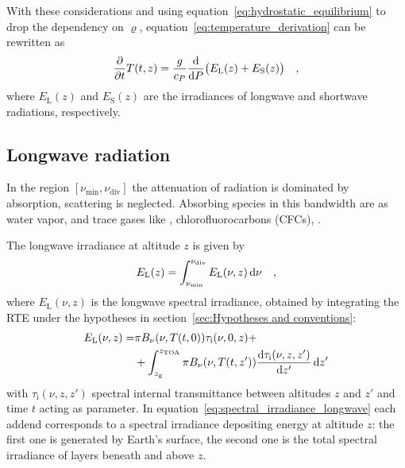 \documentclass[a4paper,10pt,twocolumn,\classoptions]{article}
\newcommand{\zTOA}{z_\text{TOA}}
\begin{document}
With these considerations and using equation~\eqref{eq:hydrostatic_equilibrium} to drop the dependency on $\varrho$, equation~\eqref{eq:temperature_derivation} can be rewritten as
\begin{equation}
  \label{eq:temperature_time_derivative}
  \pdv*{T(t,z)}{t} = \frac{g}{c_P} \odv*{\big( E_\text{L}(z) + E_\text{S}(z) \big)}{P}
  \quad ,
\end{equation}
where $E_\text{L}(z)$ and $E_\text{S}(z)$ are the irradiances of longwave and shortwave radiations, respectively.



\subsection{Longwave radiation}
\label{sec:Longwave radiation}
In the region $[\nu_\text{min}, \nu_\text{div}]$ the attenuation of radiation is dominated by absorption, scattering is neglected.
Absorbing species in this bandwidth are  as water vapor,  and trace gases like , chlorofluorocarbons (CFCs), .

The longwave irradiance at altitude $z$ is given by
\begin{equation}
  \label{eq:irradiance_longwave}
  E_\text{L}(z) = \int_{\nu_\text{min}}^{\nu_\text{div}} E_\text{L}(\nu, z) \odif{\nu}
  \quad ,
\end{equation}
where $E_\text{L}(\nu, z)$ is the longwave spectral irradiance, obtained by integrating the RTE under the hypotheses in section~\ref{sec:Hypotheses and conventions}:
\begin{equation}
  \label{eq:spectral_irradiance_longwave}
  \begin{split}
    E_\text{L}(\nu, z) = & \pi B_\nu(\nu, T(t, 0)) \tau_\text{i}(\nu, 0, z) + \\
    & + \int_{z_\text{g}}^{\zTOA} \pi B_\nu(\nu, T(t, z')) \odv{\tau_\text{i}(\nu, z, z')}{z'} \odif{z'}
  \end{split}
\end{equation}
with $\tau_\text{i}(\nu, z, z')$ spectral internal transmittance between altitudes $z$ and $z'$ and time $t$ acting as parameter.
In equation~\eqref{eq:spectral_irradiance_longwave} each addend corresponds to a spectral irradiance depositing energy at altitude $z$: the first one is generated by Earth's surface, the second one is the total spectral irradiance of layers beneath and above $z$.
\end{document}
